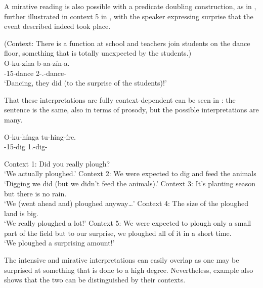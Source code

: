 \documentclass[output=paper]{langscibook}
\begin{document}
\z


A mirative reading is also possible with a predicate doubling construction, as in , further illustrated in context 5 in , with the speaker expressing surprise that the event described indeed took place.

\ea
\label{bkm:Ref117247263}
(Context: There is a function at school and teachers join students on the dance floor, something that is totally unexpected by the students.)\\
\gll
O-ku-zína  b-aa-zín-a.\\
\AUG{}-15-dance  2\SM{}-\N{}.\PST{}-dance-\FV{}\\
\glt
‘Dancing, they did (to the surprise of the students)!’\\


\z

That these interpretations are fully context-dependent can be seen in : the sentence is the same, also in terms of prosody, but the possible interpretations are many.

\ea
\label{bkm:Ref98834552}
\gll
O-ku-hínga  tu-hing-íre.\\
\AUG{}-15{}-dig  1\PL{}.\SM{}-dig-\PFV{}\\
\glt

\settowidth\jamwidth{[depreciative]}
\sn Context 1: Did you really plough? \\
‘We actually ploughed.’  \jambox*{[polarity]}
\sn Context 2: We were expected to dig and feed the animals\\
‘Digging we did (but we didn’t feed the animals).’  \jambox*{[contrast]}
\sn Context 3: It’s planting season but there is no rain.  \\ 
‘We (went ahead and) ploughed anyway…’  \jambox*{[depreciative]}
\sn Context 4: The size of the ploughed land is big. \\
‘We really ploughed a lot!’  \jambox*{[intensive]}
\sn Context 5: We were expected to plough only a small part of the field but to our surprise, we ploughed all of it in a short time.\\
‘We ploughed a surprising amount!’  \jambox*{[mirative]}
\z

The intensive and mirative interpretations can easily overlap as one may be surprised at something that is done to a high degree. Nevertheless, example  also shows that the two can be distinguished by their contexts.
\end{document}
